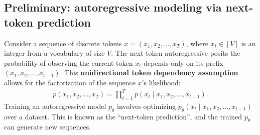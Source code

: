 
\vspace{-3pt}
\subsection{Preliminary: autoregressive modeling via next-token prediction} \label{sec:ar}
\vspace{-2pt}

Consider a sequence of discrete tokens $x = (x_1, x_2, \dots, x_T)$, where $x_t \in [V]$ is an integer from a vocabulary of size $V$.
The next-token autoregressive posits the probability of observing the current token $x_t$ depends only on its prefix $(x_1, x_2, \dots, x_{t-1})$.
This \textbf{unidirectional token dependency assumption} allows for the factorization of the sequence $x$'s likelihood:
\begin{align}
    p(x_1, x_2, \dots, x_T) = \prod_{t=1}^{T} p(x_t \mid x_1, x_2, \dots, x_{t-1}). \label{eq:ar}
\end{align}
Training an autoregressive model $p_\theta$ involves optimizing $p_\theta(x_t \mid x_1, x_2, \dots, x_{t-1})$ over a dataset.
This is known as the ``next-token prediction'', and the trained $p_\theta$ can generate new sequences.

